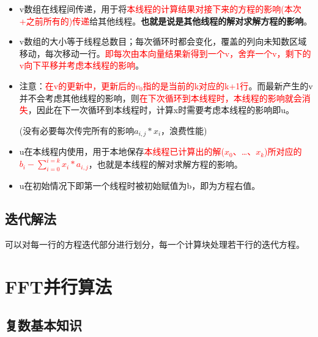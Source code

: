 \documentclass[UTF8]{article}%
\begin{document}
\begin{itemize}
    \item v数组在线程间传递，用于将\textcolor{red}{本线程的计算结果对接下来的方程的影响(本次+之前所有的)传递}给其他线程。\textbf{也就是说是其他线程的解对求解方程的影响}。
    \item v数组的大小等于线程总数目；每次循环时都会变化，覆盖的列向未知数区域移动，每次移动一行。\textcolor{red}{即每次由本向量结果新得到一个v，舍弃一个v，剩下的v向下平移并考虑本线程的影响}。
    \item 注意：\textcolor{red}{在v的更新中，更新后的$v_0$指的是当前的k对应的k+1行}。而最新产生的v并不会考虑其他线程的影响，则\textcolor{red}{在下次循环到本线程时，本线程的影响就会消失}，因此在下一次循环到本线程时，计算x时需要考虑本线程的影响即u。
    
    (没有必要每次传完所有的影响$a_{i,j}*x_i$，浪费性能)

    \item u在本线程内使用，用于本地保存\textcolor{red}{本线程已计算出的解($x_0$、\dots、$x_k$)所对应的$b_i-\sum_{i=0}^{i=k} x_i*a_{i,j}$}，也就是本线程的解对求解方程的影响。
    \item u在初始情况下即第一个线程时被初始赋值为b，即为方程右值。
\end{itemize}


\subsection{迭代解法}

可以对每一行的方程迭代部分进行划分，每一个计算块处理若干行的迭代方程。

\section{FFT并行算法}

\subsection{复数基本知识}
\end{document}
